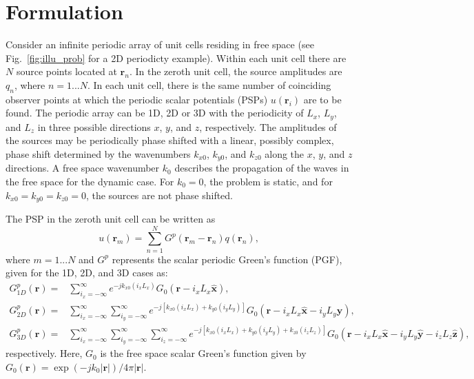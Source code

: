 \documentclass{article}
\begin{document}
\section{Formulation} \label{sec:2}
Consider an infinite periodic array of unit cells residing in free space (see Fig.~\ref{fig:illu_prob} for a 2D periodicty example). Within each unit cell there are $N$ source points located at $\mathbf{r}_n$. In the zeroth unit cell, the source amplitudes are $q_n$, where $n=1...N$. In each unit cell, there is the same number of coinciding observer points at which the periodic scalar potentials (PSPs) $u(\mathbf{r}_i)$ are to be found. The periodic array can be 1D, 2D or 3D with the periodicity of $L_x$, $L_y$, and $L_z$ in three possible directions $x$, $y$, and $z$, respectively. The amplitudes of the sources may be periodically phase shifted with a linear, possibly complex, phase shift determined by the wavenumbers $k_{x0}$, $k_{y0}$, and $k_{z0}$ along the $x$, $y$, and $z$ directions. A free space wavenumber $k_0$ describes the propagation of the waves in the free space for the dynamic case. For $k_0=0$, the problem is static, and for $k_{x0}=k_{y0}=k_{z0}=0$, the sources are not phase shifted.

The PSP in the zeroth unit cell can be written as 
\begin{equation}
    \label{eq:1}
    u(\mathbf{r}_m)=\sum_{n=1}^N G^p(\mathbf{r}_m-\mathbf{r}_n)q(\mathbf{r}_n),
\end{equation}
where $m=1...N$ and $G^p$ represents the scalar periodic Green's function (PGF), given for the 1D, 2D, and 3D cases as:
\begin{subequations}
    \label{eq:2}
    \begin{align}
        G^{p}_{1D}(\mathbf{r}) =& \sum_{i_x=-\infty}^{\infty} e^{-jk_{x0}(i_xL_x)}G_0(\mathbf{r}-i_xL_x\mathbf{\hat{x}}),\\
        G^{p}_{2D}(\mathbf{r}) =& \sum_{i_x=-\infty}^{\infty}\sum_{i_y=-\infty}^{\infty}e^{-j[k_{x0}(i_xL_x)+k_{y0}(i_yL_y)]}G_0(\mathbf{r}-i_xL_x\mathbf{\hat{x}}-i_yL_y\mathbf{\hat{y}}),\\
        G^{p}_{3D}(\mathbf{r}) =& \sum_{i_x=-\infty}^{\infty}\sum_{i_y=-\infty}^{\infty}\sum_{i_z=-\infty}^{\infty}e^{-j[k_{x0}(i_xL_x)+k_{y0}(i_yL_y)+k_{z0}(i_zL_z)]}G_0(\mathbf{r}-i_xL_x\mathbf{\hat{x}}-i_yL_y\mathbf{\hat{y}}-i_zL_z\mathbf{\hat{z}}),
    \end{align}
\end{subequations}
respectively. Here, $G_0$ is the free space scalar Green's function given by $G_0(\mathbf{r})=\exp(-jk_0|\mathbf{r}|)/4\pi|\mathbf{r}|$. 
\end{document}

